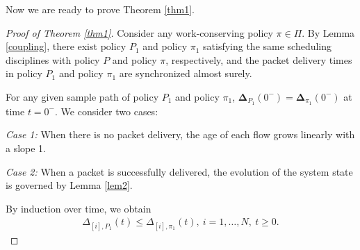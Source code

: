 Now we are ready to prove Theorem \ref{thm1}.
\begin{proof}[Proof of Theorem \ref{thm1}]
Consider any work-conserving policy $\pi\in\Pi$. By Lemma \ref{coupling}, there exist policy $P_1$ and policy $\pi_1$
satisfying the same scheduling disciplines with policy $P$ and policy $\pi$, respectively, and the packet delivery times in policy $P_1$ and policy $\pi_1$ are synchronized almost surely.

For any given sample path of policy $P_1$ and policy $\pi_1$, $\bm\Delta_{P_1}(0^-) = \bm\Delta_{\pi_1}(0^-)$ at time $t=0^-$. We consider two cases:

\emph{Case 1:} When there is no packet delivery, the age of each flow grows linearly with a slope 1. 

\emph{Case 2:} When a packet is successfully delivered, the evolution of the system state is governed by  Lemma \ref{lem2}. 

By induction over time, we obtain
\begin{align}\label{eq_thm1_proof1}
\Delta_{[i],P_1} (t) \leq \Delta_{[i],\pi_1} (t),~i=1,\ldots,N,~t\geq 0.
\end{align}


\end{proof}
